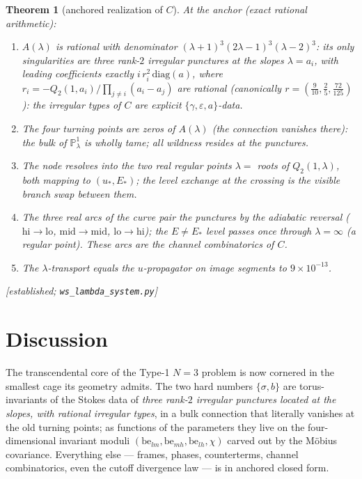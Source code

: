 \documentclass[11pt]{article}
\newtheorem{theorem}{Theorem}
\theoremstyle{definition}
\theoremstyle{remark}
\newcommand{\eps}{\varepsilon}
\newcommand{\PP}{\mathbb{P}^1}
\newcommand{\diag}{\mathrm{diag}}
\newcommand{\be}{\mathrm{be}}
\newcommand{\lo}{\mathrm{lo}}
\newcommand{\mi}{\mathrm{mid}}
\newcommand{\hi}{\mathrm{hi}}
\newcommand{\evidence}[1]{\textnormal{\small[\textit{#1}]}}
\begin{document}
\begin{theorem}[anchored realization of $C$]\label{thm:C}
At the anchor (exact rational arithmetic):
\begin{enumerate}\itemsep2pt
\item $A(\lambda)$ is rational with denominator
$(\lambda+1)^3(2\lambda-1)^3(\lambda-2)^3$: its only singularities are three rank-$2$
irregular punctures \emph{at the slopes} $\lambda=a_i$, with leading coefficients exactly
$i\,r_i^2\,\diag(a)$, where $r_i=-Q_2(1,a_i)/\prod_{j\neq i}(a_i-a_j)$ are rational
(canonically $r=(\tfrac9{10},\tfrac25,\tfrac{72}{125})$): the irregular types of $C$ are
explicit $\{\gamma,\eps,a\}$-data.
\item The four turning points are \emph{zeros} of $A(\lambda)$ (the connection vanishes
there): the bulk of $\PP_\lambda$ is wholly tame; all wildness resides at the punctures.
\item The node resolves into the two real regular points $\lambda=$ roots of
$Q_2(1,\lambda)$, both mapping to $(u_*,E_*)$; the level exchange at the crossing is the
visible branch swap between them.
\item The three real arcs of the curve pair the punctures by the adiabatic reversal
($\hi\to\lo$, $\mi\to\mi$, $\lo\to\hi$); the $E\neq E_*$ level passes once through
$\lambda=\infty$ (a regular point). These arcs are the channel combinatorics of $C$.
\item The $\lambda$-transport equals the $u$-propagator on image segments to
$9\times10^{-13}$.
\end{enumerate}
\evidence{established; \texttt{ws\_lambda\_system.py}}
\end{theorem}

\section{Discussion}\label{sec:disc}

The transcendental core of the Type-1 $N{=}3$ problem is now cornered in the smallest
cage its geometry admits. The two hard numbers $\{\sigma,b\}$ are torus-invariants of
the Stokes data of \emph{three rank-$2$ irregular punctures located at the slopes, with
rational irregular types}, in a bulk connection that literally vanishes at the old
turning points; as functions of the parameters they live on the four-dimensional
invariant moduli $(\be_{lm},\be_{mh},\be_{lh},\chi)$ carved out by the M\"obius
covariance. Everything else --- frames, phases, counterterms, channel combinatorics,
even the cutoff divergence law --- is in anchored closed form.
\end{document}
